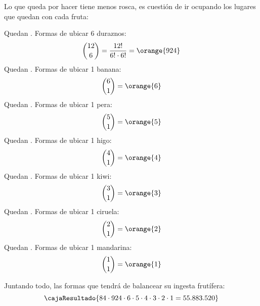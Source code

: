 Lo que queda por hacer tiene menos rosca, es cuestión de ir ocupando los lugares que quedan con cada fruta:

Quedan . Formas de ubicar 6 duraznos:
$$
  \binom{12}{6} = \frac{12!}{6! \cdot 6!} = \orange{924}
$$
Quedan . Formas de ubicar 1 banana:
$$
  \binom{6}{1} = \orange{6}
$$
Quedan . Formas de ubicar 1 pera:
$$
  \binom{5}{1} = \orange{5}
$$
Quedan . Formas de ubicar 1 higo:
$$
  \binom{4}{1} = \orange{4}
$$
Quedan . Formas de ubicar 1 kiwi:
$$
  \binom{3}{1} = \orange{3}
$$
Quedan . Formas de ubicar 1 ciruela:
$$
  \binom{2}{1} = \orange{2}
$$
Quedan . Formas de ubicar 1 mandarina:
$$
  \binom{1}{1} = \orange{1}
$$

Juntando todo, las formas que tendrá de balancear su ingesta frutífera:
$$
  \cajaResultado{
    84 \cdot 924 \cdot 6 \cdot 5 \cdot 4 \cdot 3 \cdot 2 \cdot 1 = 55.883.520
  }
$$

\begin{aportes}
  \item {}
\end{aportes}
